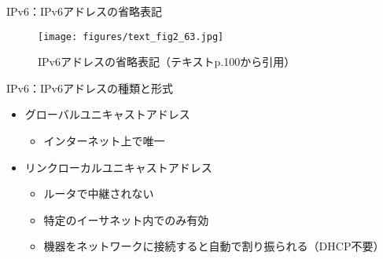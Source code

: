 \documentclass[12pt,aspectratio=169]{beamer}
\begin{document}
\begin{frame}{IPv6：IPv6アドレスの省略表記}

  \centering
  \begin{figure}
    \centering
    \texttt{[image: figures/text\_fig2\_63.jpg]}
    \label{fig:text_fig2_63}
    \caption{IPv6アドレスの省略表記（テキストp.100から引用）}
  \end{figure}

\end{frame}

\begin{frame}{IPv6：IPv6アドレスの種類と形式}

  \begin{itemize}
    \item グローバルユニキャストアドレス
    \begin{itemize}
      \item インターネット上で唯一
    \end{itemize}
    \item リンクローカルユニキャストアドレス
    \begin{itemize}
      \item ルータで中継されない
      \item 特定のイーサネット内でのみ有効
      \item 機器をネットワークに接続すると自動で割り振られる（DHCP不要）
    \end{itemize}
  \end{itemize}

\end{frame}
\end{document}
